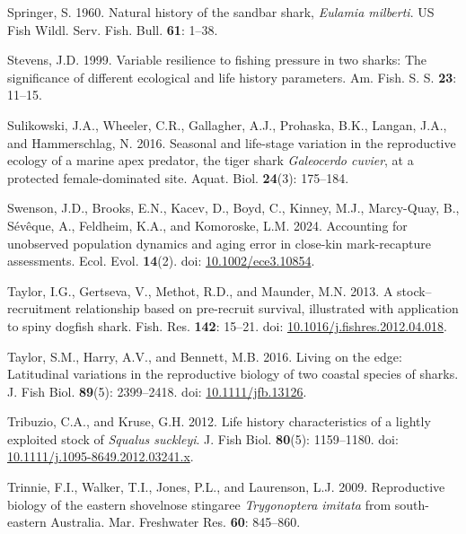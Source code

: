 \documentclass[
]{article}
\newenvironment{CSLReferences}%
  {}%
  {\par}
\begin{document}
\begin{CSLReferences}{1}{0}
Springer, S. 1960. Natural history of the sandbar shark, \emph{{Eulamia} milberti}. US Fish Wildl. Serv. Fish. Bull. \textbf{61}: 1--38.

Stevens, J.D. 1999. Variable resilience to fishing pressure in two sharks: The significance of different ecological and life history parameters. Am. Fish. S. S. \textbf{23}: 11--15.

Sulikowski, J.A., Wheeler, C.R., Gallagher, A.J., Prohaska, B.K., Langan, J.A., and Hammerschlag, N. 2016. Seasonal and life-stage variation in the reproductive ecology of a marine apex predator, the tiger shark \emph{{Galeocerdo} cuvier}, at a protected female-dominated site. Aquat. Biol. \textbf{24}(3): 175--184.

Swenson, J.D., Brooks, E.N., Kacev, D., Boyd, C., Kinney, M.J., Marcy-Quay, B., Sévêque, A., Feldheim, K.A., and Komoroske, L.M. 2024. Accounting for unobserved population dynamics and aging error in close{-}kin mark{-}recapture assessments. Ecol. Evol. \textbf{14}(2). doi: \href{https://doi.org/10.1002/ece3.10854}{10.1002/ece3.10854}.

Taylor, I.G., Gertseva, V., Methot, R.D., and Maunder, M.N. 2013. A stock--recruitment relationship based on pre-recruit survival, illustrated with application to spiny dogfish shark. Fish. Res. \textbf{142}: 15--21. doi: \href{https://doi.org/10.1016/j.fishres.2012.04.018}{10.1016/j.fishres.2012.04.018}.

Taylor, S.M., Harry, A.V., and Bennett, M.B. 2016. Living on the edge: Latitudinal variations in the reproductive biology of two coastal species of sharks. J. Fish Biol. \textbf{89}(5): 2399--2418. doi: \href{https://doi.org/10.1111/jfb.13126}{10.1111/jfb.13126}.

Tribuzio, C.A., and Kruse, G.H. 2012. Life history characteristics of a lightly exploited stock of \emph{{Squalus} suckleyi}. J. Fish Biol. \textbf{80}(5): 1159--1180. doi: \href{https://doi.org/10.1111/j.1095-8649.2012.03241.x}{10.1111/j.1095-8649.2012.03241.x}.

Trinnie, F.I., Walker, T.I., Jones, P.L., and Laurenson, L.J. 2009. Reproductive biology of the eastern shovelnose stingaree \emph{{Trygonoptera} imitata} from south-eastern {Australia}. Mar. Freshwater Res. \textbf{60}: 845--860.


\end{CSLReferences}
\end{document}
